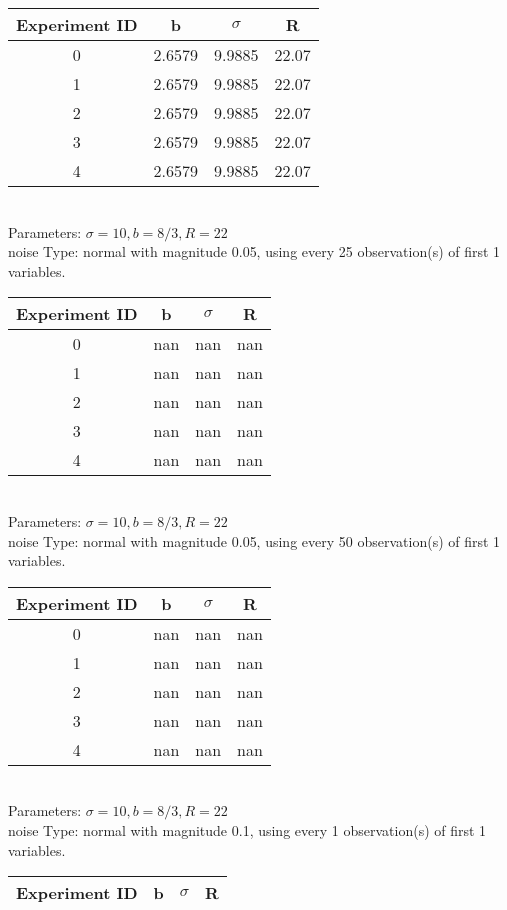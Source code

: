 \begin{multicols}{3}
\begin{tabular}{cccc}
\hline Experiment ID & b & $\sigma$ & R \\ \hline 
0 & 2.6579 & 9.9885 & 22.07\\ \hline 
 1 & 2.6579 & 9.9885 & 22.07\\ \hline 
 2 & 2.6579 & 9.9885 & 22.07\\ \hline 
 3 & 2.6579 & 9.9885 & 22.07\\ \hline 
 4 & 2.6579 & 9.9885 & 22.07\\ \hline 
 \end{tabular}\\
Parameters: $\sigma=10, b=8/3, R=22$\\
noise Type: normal with magnitude 0.05, using every 25 observation(s) of first 1 variables.\\
\begin{tabular}{cccc}
\hline Experiment ID & b & $\sigma$ & R \\ \hline 
0 & nan & nan & nan\\ \hline 
 1 & nan & nan & nan\\ \hline 
 2 & nan & nan & nan\\ \hline 
 3 & nan & nan & nan\\ \hline 
 4 & nan & nan & nan\\ \hline 
 \end{tabular}\\
Parameters: $\sigma=10, b=8/3, R=22$\\
noise Type: normal with magnitude 0.05, using every 50 observation(s) of first 1 variables.\\
\begin{tabular}{cccc}
\hline Experiment ID & b & $\sigma$ & R \\ \hline 
0 & nan & nan & nan\\ \hline 
 1 & nan & nan & nan\\ \hline 
 2 & nan & nan & nan\\ \hline 
 3 & nan & nan & nan\\ \hline 
 4 & nan & nan & nan\\ \hline 
 \end{tabular}\\
Parameters: $\sigma=10, b=8/3, R=22$\\
noise Type: normal with magnitude 0.1, using every 1 observation(s) of first 1 variables.\\
\begin{tabular}{cccc}
\hline Experiment ID & b & $\sigma$ & R \\ \hline 

\end{tabular}
\end{multicols}
